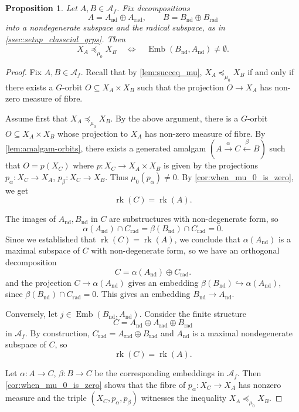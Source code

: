 \documentclass[11pt,a4paper]{amsart}
\theoremstyle{plain}%
\newtheorem{proposition}[lemma]{Proposition}
\theoremstyle{definition}
\theoremstyle{remark}
\newcommand{\rk}{{\operatorname{rk}}}
\newcommand{\Emb}{\operatorname{Emb}}
\newcommand{\rad}{\operatorname{rad}}
\newcommand{\nd}{\mathrm{nd}}
\newcommand{\rmrad}{\mathrm{rad}}
\begin{document}
\begin{proposition}\label{prop:core-preorder-revised}
Let $A, B\in \mathcal{A}_f$. Fix decompositions 
\[
 A=A_{\nd}\oplus A_{\rmrad}, \qquad  B=B_{\nd}\oplus B_{\rmrad}
\]
into a nondegenerate subspace and the radical subspace, as in \cref{ssec:setup_classcial_grps}.
Then
\[
 X_A\preceq_{\mu_0}X_B
 \quad\Longleftrightarrow\quad
 \Emb(B_{\nd}, A_{\nd})\neq \emptyset.
\]
\end{proposition}


\begin{proof}
Fix $A, B\in \mathcal{A}_f$.
Recall that by \cref{lem:succeq_mu}, $X_A\preceq_{\mu_0}X_B$ if and only if there exists a $G$-orbit $ O\subseteq X_A\times X_B
$
such that the projection $O\to X_A$ has non-zero measure of fibre.

Assume first that $X_A\preceq_{\mu_0}X_B$. By
the above argument, there is a $G$-orbit
$O\subseteq X_A\times X_B$ whose projection to $X_A$ has non-zero measure of fibre. 
By \cref{lem:amalgam-orbits}, there exists a generated amalgam $(A\xrightarrow{\alpha} C\xleftarrow{\beta}B)$ such that $O=p(X_C)$ where $p:X_C\to X_A\times X_B$ is given by the projections $p_{\alpha}:X_C\to X_A$, $p_{\beta}:X_C\to X_B$. Thus $\mu_0(p_{\alpha})\neq 0$. By \cref{cor:when_mu_0_is_zero}, we get
\[
 \rk(C)=\rk(A).
\]


The images of $A_{\nd}, B_{\nd}$ in $C$ are substructures with non-degenerate form, so $$\alpha(A_{\nd})\cap C_{\rad}=\beta(B_{\nd})\cap C_{\rad}=0.$$ Since we established that $ \rk(C)=\rk(A)$, we conclude that $\alpha(A_{\nd})$ is a maximal subspace of $C$ with non-degenerate form, so we have an orthogonal decomposition $$C=\alpha(A_{\nd})\oplus C_{\rmrad}.$$ and the projection $C \to \alpha(A_{\nd})$ gives an embedding $\beta(B_{\nd}) \hookrightarrow \alpha(A_{\nd})$, since $\beta(B_{\nd})\cap C_{\rad}=0$. This gives an embedding $B_{\nd}\to A_{\nd}$.




Conversely, let $j\in \Emb(B_{\nd}, A_{\nd})$. Consider the finite structure $$C=A_{\nd}\oplus A_{\rad}\oplus B_{\rad}$$
in $\mathcal{A}_f$. By construction, $C_{\rad} = A_{\rad}\oplus B_{\rad}$ and $A_{\nd}$ is a maximal nondegenerate subspace of $C$, so
\[
 \rk(C)=\rk(A).
\]


Let $\alpha:A\to C$, $\beta: B\to C$ be the corresponding embeddings in $\mathcal{A}_f$.
Then \cref{cor:when_mu_0_is_zero} shows that the fibre of $p_{\alpha}:X_C\to X_A$ has
nonzero measure and the triple $(X_C, p_{\alpha}, p_{\beta})$ witnesses the inequality
$X_A \preceq_{\mu_0} X_B$.
\end{proof}
\end{document}
